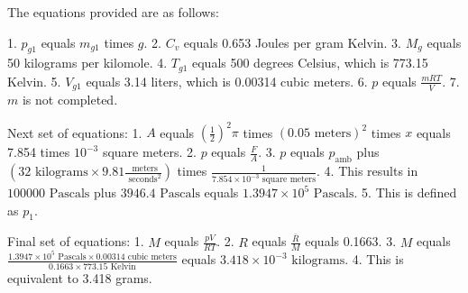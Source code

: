 The equations provided are as follows:

1. \( p_{g1} \) equals \( m_{g1} \) times \( g \).
2. \( C_v \) equals 0.653 Joules per gram Kelvin.
3. \( M_g \) equals 50 kilograms per kilomole.
4. \( T_{g1} \) equals 500 degrees Celsius, which is 773.15 Kelvin.
5. \( V_{g1} \) equals 3.14 liters, which is 0.00314 cubic meters.
6. \( p \) equals \( \frac{mRT}{V} \).
7. \( m \) is not completed.

Next set of equations:
1. \( A \) equals \( \left( \frac{1}{2} \right)^2 \pi \) times \( (0.05 \text{ meters})^2 \) times \( x \) equals 7.854 times \( 10^{-3} \) square meters.
2. \( p \) equals \( \frac{F}{A} \).
3. \( p \) equals \( p_{\text{amb}} \) plus \( \left( 32 \text{ kilograms} \times 9.81 \frac{\text{ meters}}{\text{ seconds}^2} \right) \) times \( \frac{1}{7.854 \times 10^{-3} \text{ square meters}} \).
4. This results in \( 100000 \text{ Pascals} \) plus \( 3946.4 \text{ Pascals} \) equals \( 1.3947 \times 10^5 \text{ Pascals} \).
5. This is defined as \( p_1 \).

Final set of equations:
1. \( M \) equals \( \frac{pV}{RT} \).
2. \( R \) equals \( \frac{\bar{R}}{M} \) equals 0.1663.
3. \( M \) equals \( \frac{1.3947 \times 10^5 \text{ Pascals} \times 0.00314 \text{ cubic meters}}{0.1663 \times 773.15 \text{ Kelvin}} \) equals \( 3.418 \times 10^{-3} \text{ kilograms} \).
4. This is equivalent to 3.418 grams.